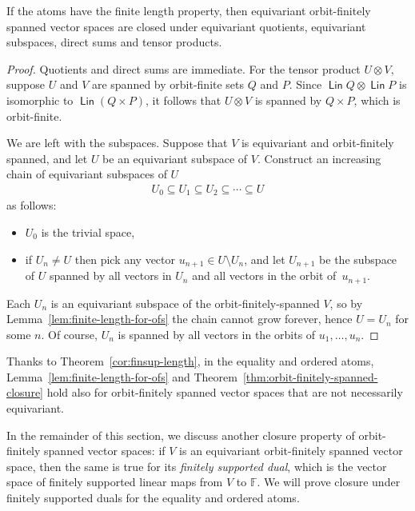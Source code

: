 \documentclass[10pt,a4paper]{amsart}
\numberwithin{equation}{section}
\DeclareMathOperator{\lin}{\mathsf{Lin}}
\newcommand{\field}{\mathbb F}
\begin{document}
\begin{theorem}\label{thm:orbit-finitely-spanned-closure}
If the atoms have the finite length property, then
equivariant orbit-finitely spanned vector spaces  are closed under equivariant quotients, equivariant subspaces, direct sums and tensor products.
\end{theorem}
\begin{proof}
   Quotients and direct sums are immediate.  For the tensor product $U \otimes V$, suppose $U$ and $V$ are spanned by orbit-finite sets $Q$ and $P$.
   Since  $\lin Q \otimes \lin P$ is isomorphic to $\lin (Q \times P)$, it follows that  $U \otimes V$ is spanned by $Q \times P$, which is orbit-finite. 
   
   We are left with the subspaces. Suppose that $V$ is equivariant and orbit-finitely spanned, and let $U$ be an equivariant subspace of $V$. Construct an increasing chain of equivariant subspaces of $U$ \begin{align*}
    U_0\subseteq U_1 \subseteq U_2 \subseteq \cdots \subseteq U
    \end{align*} 
as follows:
\begin{itemize}
\item $U_0$ is the trivial space,
\item if $U_n\neq U$ then pick any vector $u_{n+1}\in U\setminus U_n$, and let $U_{n+1}$ be the subspace of $U$ spanned by all vectors in $U_n$ and all vectors in the orbit of~$u_{n+1}$.
\end{itemize}   
Each $U_n$ is an equivariant subspace of the orbit-finitely-spanned $V$, so by Lemma~\ref{lem:finite-length-for-ofs} the chain cannot grow forever, hence $U=U_n$ for some $n$. Of course, $U_n$ is spanned by all vectors in the orbits of $u_1,\ldots,u_n$.
\end{proof}

Thanks to Theorem~\ref{cor:finsup-length}, in the equality and ordered atoms,  Lemma~\ref{lem:finite-length-for-ofs} and Theorem~\ref{thm:orbit-finitely-spanned-closure} hold also for orbit-finitely spanned vector spaces that are  not necessarily equivariant.

In the remainder of this section, we discuss another closure property of orbit-finitely spanned vector spaces: if $V$ is an equivariant orbit-finitely spanned vector space, then the same is true for its \emph{finitely supported dual}, which is the vector space of finitely supported linear maps from $V$ to $\field$. We will prove closure under finitely supported duals for the equality and ordered atoms.
\end{document}
